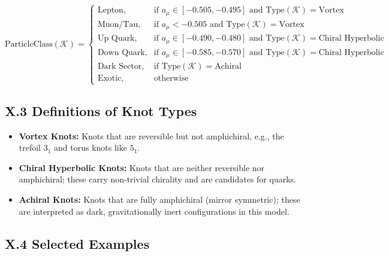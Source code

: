 \documentclass[11pt]{article}
\begin{document}
    \begin{equation}
        \label{eq:classification}
        \boxed{
            \text{ParticleClass}(\mathcal{K}) =
            \begin{cases}
                \text{Lepton},     & \text{if } a_\mu \in [-0.505, -0.495] \text{ and } \text{Type}(\mathcal{K}) = \text{Vortex} \\
                \text{Muon/Tau},   & \text{if } a_\mu < -0.505 \text{ and } \text{Type}(\mathcal{K}) = \text{Vortex} \\
                \text{Up Quark},   & \text{if } a_\mu \in [-0.490, -0.480] \text{ and } \text{Type}(\mathcal{K}) = \text{Chiral Hyperbolic} \\
                \text{Down Quark}, & \text{if } a_\mu \in [-0.585, -0.570] \text{ and } \text{Type}(\mathcal{K}) = \text{Chiral Hyperbolic} \\
                \text{Dark Sector},& \text{if } \text{Type}(\mathcal{K}) = \text{Achiral} \\
                \text{Exotic},     & \text{otherwise}
            \end{cases}
        }
    \end{equation}

    \subsection*{X.3 Definitions of Knot Types}

    \begin{itemize}
        \item \textbf{Vortex Knots:} Knots that are reversible but not amphichiral, e.g., the trefoil $3_1$ and torus knots like $5_1$.
        \item \textbf{Chiral Hyperbolic Knots:} Knots that are neither reversible nor amphichiral; these carry non-trivial chirality and are candidates for quarks.
        \item \textbf{Achiral Knots:} Knots that are fully amphichiral (mirror symmetric); these are interpreted as dark, gravitationally inert configurations in this model.
    \end{itemize}

    \subsection*{X.4 Selected Examples}
\end{document}

